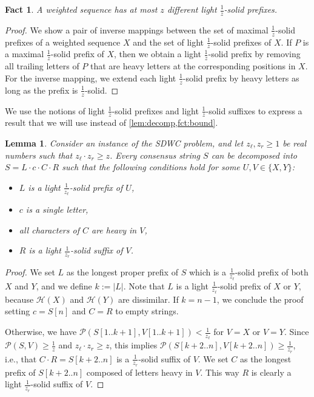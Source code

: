 \documentclass{article}
\theoremstyle{plain}
\newtheorem{lemma}[theorem]{Lemma}
\newtheorem{fact}[theorem]{Fact}
\theoremstyle{definition}
\newcommand{\SDWC}{\textsc{SDWC}\xspace}
\renewcommand{\H}{\mathcal{H}}
\renewcommand{\P}{\mathcal{P}}
\newcommand{\fr}{\ensuremath{\frac1z}}
\newcommand{\mayqed}{}
\begin{document}
    \begin{fact}\label{fct:lightprefixes}
      A weighted sequence has at most $z$ different light \fr-solid prefixes.
    \end{fact}
    \begin{proof}
      We show a pair of inverse mappings between the set of maximal \fr-solid prefixes of a weighted sequence $X$ and the
      set of light \fr-solid prefixes of $X$.
      If $P$ is a maximal \fr-solid prefix of $X$, then we obtain a light \fr-solid prefix 
      by removing all trailing letters of $P$ that are heavy letters at the corresponding positions in $X$. 
      For the inverse mapping, we extend each light \fr-solid prefix by heavy letters as long as the prefix is \fr-solid.
    \mayqed\end{proof} 
   
    
    We use the notions of light \fr-solid prefixes and light \fr-solid suffixes to express a result 
    that we will use instead of \cref{lem:decomp,fct:bound}.
    
     \begin{lemma}\label{fct:key}
     Consider an instance of the \SDWC problem,
     and let $z_\ell,z_r \ge 1$ be real numbers such that $z_\ell \cdot z_r \ge z$. 
      Every consensus string $S$
      can be decomposed into $S= L \cdot c\cdot  C \cdot R$ such that the following conditions hold for some $U,V\in \{X,Y\}$:
      \begin{itemize}
        \item $L$ is a light $\frac{1}{z_\ell}$-solid prefix of $U$,
        \item $c$ is a single letter,
        \item all characters of $C$ are heavy in $V$,
        \item $R$ is a light $\frac{1}{z_r}$-solid suffix of $V$.
        \end{itemize}
    \end{lemma}
      \begin{proof}
        We set $L$ as the longest proper prefix of $S$ which is a $\frac{1}{z_{\ell}}$-solid prefix of both $X$ and $Y$,
        and we define $k := |L|$.  Note that $L$ is a light $\frac{1}{z_{\ell}}$-solid prefix of $X$ or $Y$, because $\H(X)$ and $\H(Y)$
        are dissimilar. If $k=n-1$, we conclude the proof setting $c=S[n]$ and $C=R$ to empty strings.
        
        Otherwise, we have $\P(S[1..k+1],V[1..k+1])<\frac{1}{z_\ell}$ for $V=X$ or $V=Y$.
        Since $\P(S,V)\ge \fr$ and $z_\ell \cdot z_r \ge z$, this implies
        $\P(S[k+2..n],V[k+2..n])\ge \frac{1}{z_r}$, i.e., that $C\cdot R = S[k+2..n]$ is a $\frac{1}{z_r}$-solid suffix of $V$.
        We set $C$ as the longest prefix of $S[k+2..n]$ composed of letters heavy in $V$.
        This way $R$ is clearly a light $\frac{1}{z_r}$-solid suffix of $V$.
      \end{proof}
      
\end{document}
